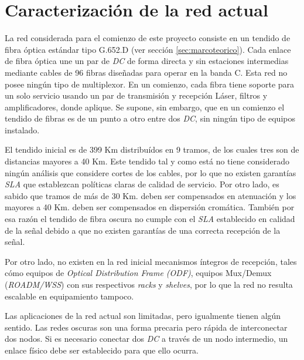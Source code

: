 \section{Caracterización de la red actual}
\label{sec:caracterizacion}

La red considerada para el comienzo de este proyecto consiste en un
tendido de fibra óptica estándar tipo G.652.D (ver sección
\ref{sec:marcoteorico}). Cada enlace de fibra óptica une un par de
\emph{DC} de forma directa y sin estaciones intermedias mediante
cables de 96 fibras diseñadas para operar en la banda C. Esta red no
posee ningún tipo de multiplexor. En un comienzo, cada fibra tiene
soporte para un solo servicio usando un par de transmisión y recepción
Láser, filtros y amplificadores, donde aplique. Se supone, sin
embargo, que en un comienzo el tendido de fibras es de un punto a otro
entre dos \emph{DC}, sin ningún tipo de equipos instalado.

El tendido inicial es de 399 Km distribuídos en 9 tramos, de los
cuales tres son de distancias mayores a 40 Km. Este tendido tal y como
está no tiene considerado ningún análisis que considere cortes de los
cables, por lo que no existen garantías \emph{SLA} que establezcan
políticas claras de calidad de servicio. Por otro lado, es sabido que
tramos de más de 30 Km. deben ser compensados en atenuación y los
mayores a 40 Km. deben ser compensados en dispersión
cromática. También por esa razón el tendido de fibra oscura no cumple
con el \emph{SLA} establecido en calidad de la señal debido a que no
existen garantías de una correcta recepción de la señal.

Por otro lado, no existen en la red inicial mecanismos íntegros de
recepción, tales cómo equipos de \textit{Optical Distribution Frame
  (ODF)}, equipos Mux/Demux (\textit{ROADM/WSS}) con sus respectivos
\textit{racks} y \textit{shelves}, por lo que la red no resulta
escalable en equipamiento tampoco.

Las aplicaciones de la red actual son limitadas, pero igualmente
tienen algún sentido. Las redes oscuras son una forma precaria pero
rápida de interconectar dos nodos. Si es necesario conectar dos
\emph{DC} a través de un nodo intermedio, un enlace físico debe ser
establecido para que ello ocurra.



